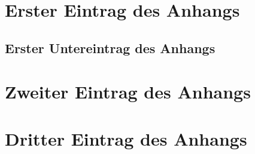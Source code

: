 \section{Erster Eintrag des Anhangs}

\subsection{Erster Untereintrag des Anhangs}

\section{Zweiter Eintrag des Anhangs}

\section{Dritter Eintrag des Anhangs}

